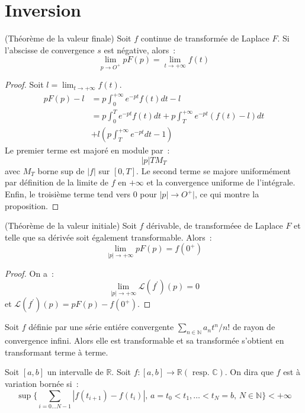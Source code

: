 \section{Inversion}
\begin{mandatory}
\begin{prop}(Théorème de la valeur finale)
Soit $f$ continue de transformée de Laplace $F$. Si l'abscisse de convergence
$s$ est négative, alors~:
\[
\lim_{p \to O^+} p F(p) = \lim_{t \to +\infty} f(t)
\]
\end{prop}
\end{mandatory}
\begin{proof}
Soit $l = \lim_{t \to +\infty} f(t)$. 
\begin{align*}
pF(p) - l & = p \int_0^{+\infty} e^{-pt}f(t) dt - l \\
&= p \int_0^T  e^{-pt}f(t) dt + p  \int_T^{+\infty}e^{-pt}(f(t) -l) dt
\\ &+ l \left (
p \int_T^{+\infty} e^{-pt}dt -1
\right )
\end{align*}
Le premier terme est majoré en module par~:
\[
|p| T M_T
\]
avec $M_T$ borne sup de $|f|$ sur $[0,T]$.
Le second terme se majore uniformément par définition de la limite de
$f$ en $+\infty$ et la convergence uniforme de l'intégrale. Enfin, le
troisième terme tend vers 0 pour $|p|\to O^+|$, ce qui montre la proposition.
\end{proof}
\begin{mandatory}
\begin{prop}(Théorème de la valeur initiale)
Soit $f$ dérivable, de transforméee de Laplace $F$ et telle que sa
dérivée soit également transformable. Alors~:
\[
\lim_{|p|\to +\infty} p F(p) = f(0^+)
\]
\end{prop}
\end{mandatory}
\begin{proof}
On a~:
\[
\lim_{|p| \to +\infty} \mathcal{L}(f^\prime)(p) = 0
\]
et $\mathcal{L}(f^\prime)(p) = p F(p) - f(0^+)$.
\end{proof}
\begin{mandatory}
\begin{prop}
Soit $f$ définie par une série entiére convergente $\sum_{n \in
\mathbb{N}} a_n t^n / n!$ de rayon de convergence infini. Alors elle
est transformable et sa transformée s'obtient en transformant terme à terme.
\end{prop}
\end{mandatory}
\begin{defn}
Soit $[a,b]$ un intervalle de $\mathbb{R}$. Soit $f : [a,b] \to \mathbb{R} (\mbox{ resp. } \mathbb{C})$. On dira
que $f$ est à variation bornée si~:
\[
\sup \{ \sum_{i=0\dots N-1} |f(t_{i+1}) - f(t_i)|, \, a = t_0 < t_1, \dots < t_N = b, \, N \in \mathbb{N} \} < + \infty
\]
\end{defn}

